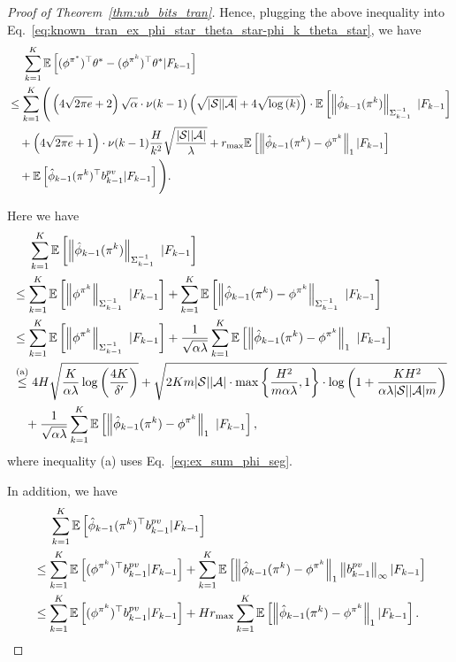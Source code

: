 \begin{proof}[Proof of Theorem~\ref{thm:ub_bits_tran}]
	Hence, plugging the above inequality into Eq.~\eqref{eq:known_tran_ex_phi_star_theta_star-phi_k_theta_star}, we have
	\begin{align*}
		&\quad\  \sum_{k=1}^{K} \mathbb{E}\left[  (\phi^{\pi^*})^\top \theta^* - (\phi^{\pi^k})^\top \theta^* | F_{k-1}  \right] 
		\\
		&\leq \sum_{k=1}^{K} \Bigg( \left( 4\sqrt{2\pi e} + 2 \right) \sqrt{\alpha} \cdot \nu(k-1) \left(  \sqrt{|\mathcal{S}||\mathcal{A}|} + 4 \sqrt{\log\left( k \right)}  \right) \cdot \mathbb{E}\left[  \left\|  \hat{\phi}_{k-1}(\pi^k)  \right\|_{\Sigma_{k-1}^{-1}} \ | F_{k-1} \right] 
		\\
		&\quad + \left( 4\sqrt{2\pi e} + 1 \right) \cdot \nu(k-1) \frac{H}{k^2} \sqrt{ \frac{|\mathcal{S}| |\mathcal{A}|}{\lambda} }
		+ r_{\max} \mathbb{E}\left[  \left\|  \hat{\phi}_{k-1}(\pi^k) - \phi^{\pi^k}  \right\|_1 | F_{k-1}  \right]  
		\\
		&\quad + \mathbb{E}\left[  \hat{\phi}_{k-1}(\pi^k)^\top b^{pv}_{k-1} | F_{k-1}  \right] \Bigg) .
	\end{align*}
	
	Here we have
	\begin{align*}
		&\quad\ \sum_{k=1}^{K} \mathbb{E}\left[  \left\|  \hat{\phi}_{k-1}(\pi^k)  \right\|_{\Sigma_{k-1}^{-1}} \ | F_{k-1} \right] 
		\\
		&\leq \sum_{k=1}^{K} \mathbb{E}\left[  \left\|  \phi^{\pi^k}  \right\|_{\Sigma_{k-1}^{-1}} \ | F_{k-1} \right] + \sum_{k=1}^{K} \mathbb{E}\left[  \left\|  \hat{\phi}_{k-1}(\pi^k) - \phi^{\pi^k}  \right\|_{\Sigma_{k-1}^{-1}} \ | F_{k-1} \right]
		\\
		&\leq \sum_{k=1}^{K} \mathbb{E}\left[  \left\|  \phi^{\pi^k}  \right\|_{\Sigma_{k-1}^{-1}} \ | F_{k-1} \right] + \frac{1}{\sqrt{\alpha \lambda}} \sum_{k=1}^{K} \mathbb{E}\left[  \left\|  \hat{\phi}_{k-1}(\pi^k) - \phi^{\pi^k}  \right\|_1 \ | F_{k-1} \right]
		\\
		&\overset{\textup{(a)}}{\leq}  4H\sqrt{ \frac{K}{\alpha \lambda} \log\left( \frac{4K}{\delta'} \right) } + \sqrt{ 2Km |\mathcal{S}| |\mathcal{A}| \cdot \max\left\{  \frac{H^2}{m \alpha \lambda}, 1 \right\} \cdot \log \left(  1+ \frac{  KH^2 }{ \alpha \lambda |\mathcal{S}| |\mathcal{A}| m }  \right) } 
		\\
		&\quad + \frac{1}{\sqrt{\alpha \lambda}} \sum_{k=1}^{K} \mathbb{E}\left[  \left\|  \hat{\phi}_{k-1}(\pi^k) - \phi^{\pi^k}  \right\|_1 \ | F_{k-1} \right] ,
	\end{align*}
	where inequality (a) uses Eq.~\eqref{eq:ex_sum_phi_seg}. 
	
	In addition, we have
	\begin{align*}
		&\quad\ \sum_{k=1}^{K} \mathbb{E}\left[  \hat{\phi}_{k-1}(\pi^k)^\top b^{pv}_{k-1} | F_{k-1}   \right]
		\\
		&\leq \sum_{k=1}^{K} \mathbb{E}\left[  (\phi^{\pi^k})^\top b^{pv}_{k-1} | F_{k-1}  \right] + \sum_{k=1}^{K} \mathbb{E}\left[  \left\| \hat{\phi}_{k-1}(\pi^k) - \phi^{\pi^k}  \right\|_1 \left\| b^{pv}_{k-1} \right\|_{\infty} | F_{k-1}  \right]
		\\
		&\leq \sum_{k=1}^{K} \mathbb{E}\left[  (\phi^{\pi^k})^\top b^{pv}_{k-1} | F_{k-1}  \right] + H r_{\max} \sum_{k=1}^{K} \mathbb{E}\left[  \left\| \hat{\phi}_{k-1}(\pi^k) - \phi^{\pi^k}  \right\|_1  | F_{k-1}  \right] .
	\end{align*}
	

\end{proof}
